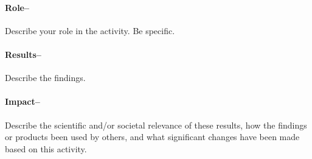 \paragraph{Role--}

Describe your role in the activity. Be specific.

\paragraph{Results--} 

Describe the findings.

\paragraph{Impact--} 

Describe the scientific and/or societal relevance of these results, how the findings or products been used by others, and what significant changes have been made based on this activity.

